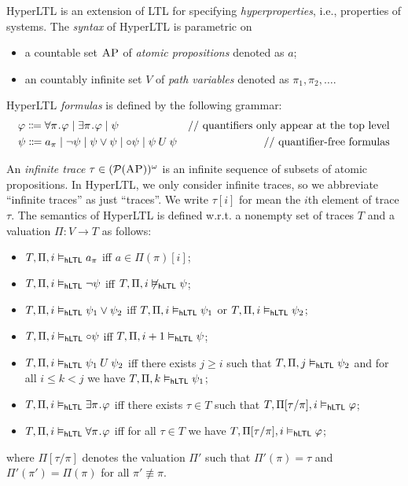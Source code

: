 \documentclass{amsart}
\begin{document}
HyperLTL is an extension of LTL
for specifying \emph{hyperproperties}, i.e., properties of systems.
The \emph{syntax} of HyperLTL is parametric on
\begin{itemize}
\item a countable set $\textsc{AP}$ of \emph{atomic propositions} denoted as $a$;
\item an countably infinite set $V$ of \emph{path variables} denoted as 
$\pi_1,\pi_2,\dots$.
\end{itemize}
HyperLTL \emph{formulas} is defined by the following grammar:
\begin{align*}
&\varphi \Coloneqq \forall \pi \ldot \varphi \mid
                  \exists \pi \ldot \varphi \mid
                  \psi
& \text{\slashslash quantifiers only appear at the top level}
\\
&\psi \Coloneqq a_\pi \mid \neg \psi \mid \psi \vee \psi \mid \wnext \psi
               \mid \psi \until \psi
& \text{\slashslash quantifier-free formulas}
\end{align*}

An \emph{infinite trace} $\tau \in (\mathcal{P}(\textsc{AP}))^\omega$ is an infinite sequence 
of subsets of atomic propositions.
In HyperLTL, we only consider infinite traces, so we abbreviate ``infinite 
traces'' as just ``traces''.
We write $\tau[i]$ for mean the $i$th element of trace $\tau$.
The semantics of HyperLTL is defined w.r.t. a  nonempty set of traces
$T$ and a valuation $\Pi \colon V \to T$ as follows:
\begin{itemize}
\item $T,\Pi,i \vDash_{\mathsf{hLTL}} a_\pi$ iff $a \in \Pi(\pi)[i]$;
\item $T,\Pi,i \vDash_{\mathsf{hLTL}} \neg \psi$ iff $T,\Pi,i \not\vDash_{\mathsf{hLTL}} \psi$;
\item $T,\Pi,i \vDash_{\mathsf{hLTL}} \psi_1 \vee \psi_2$
      iff $T,\Pi,i \vDash_{\mathsf{hLTL}} \psi_1$
      or $T,\Pi,i \vDash_{\mathsf{hLTL}} \psi_2$;
\item $T,\Pi,i \vDash_{\mathsf{hLTL}} {\circ} \psi$ iff
      $T,\Pi, i+1 \vDash_{\mathsf{hLTL}} \psi$;
\item $T,\Pi,i \vDash_{\mathsf{hLTL}} \psi_1 \mathbin{U} \psi_2$ iff
      there exists $j \ge i$ such that
      $T,\Pi,j \vDash_{\mathsf{hLTL}} \psi_2$ and
      for all $i \le k < j$ we have $T,\Pi,k \vDash_{\mathsf{hLTL}} \psi_1$;
\item $T,\Pi,i \vDash_{\mathsf{hLTL}} \exists \pi \mathbin{\!.\!} \varphi$ iff
      there exists $\tau \in T$ such that
      $T,\Pi[\tau/\pi],i \vDash_{\mathsf{hLTL}} \varphi$;
\item $T,\Pi,i \vDash_{\mathsf{hLTL}} \forall \pi \mathbin{\!.\!} \varphi$ iff
      for all $\tau \in T$ we have
      $T,\Pi[\tau/\pi],i \vDash_{\mathsf{hLTL}} \varphi$;
\end{itemize}
where $\Pi[\tau/\pi]$ denotes the valuation $\Pi'$ such that 
$\Pi'(\pi) = \tau$ and $\Pi'(\pi') = \Pi(\pi)$ for all $\pi' \not\equiv \pi$.
\end{document}
